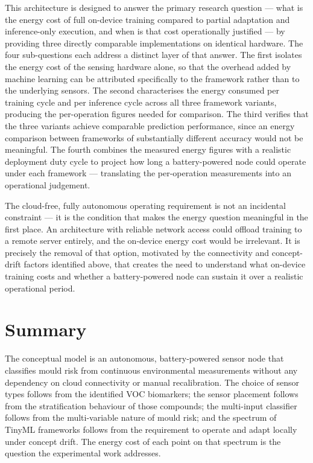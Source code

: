 This architecture is designed to answer the primary research question --- what is the energy cost of full on-device training compared to partial adaptation and inference-only execution, and when is that cost operationally justified --- by providing three directly comparable implementations on identical hardware. The four sub-questions each address a distinct layer of that answer. The first isolates the energy cost of the sensing hardware alone, so that the overhead added by machine learning can be attributed specifically to the framework rather than to the underlying sensors. The second characterises the energy consumed per training cycle and per inference cycle across all three framework variants, producing the per-operation figures needed for comparison. The third verifies that the three variants achieve comparable prediction performance, since an energy comparison between frameworks of substantially different accuracy would not be meaningful. The fourth combines the measured energy figures with a realistic deployment duty cycle to project how long a battery-powered node could operate under each framework --- translating the per-operation measurements into an operational judgement.

The cloud-free, fully autonomous operating requirement is not an incidental constraint --- it is the condition that makes the energy question meaningful in the first place. An architecture with reliable network access could offload training to a remote server entirely, and the on-device energy cost would be irrelevant. It is precisely the removal of that option, motivated by the connectivity and concept-drift factors identified above, that creates the need to understand what on-device training costs and whether a battery-powered node can sustain it over a realistic operational period.

\section{Summary}

The conceptual model is an autonomous, battery-powered sensor node that classifies mould risk from continuous environmental measurements without any dependency on cloud connectivity or manual recalibration. The choice of sensor types follows from the identified VOC biomarkers; the sensor placement follows from the stratification behaviour of those compounds; the multi-input classifier follows from the multi-variable nature of mould risk; and the spectrum of TinyML frameworks follows from the requirement to operate and adapt locally under concept drift. The energy cost of each point on that spectrum is the question the experimental work addresses.
